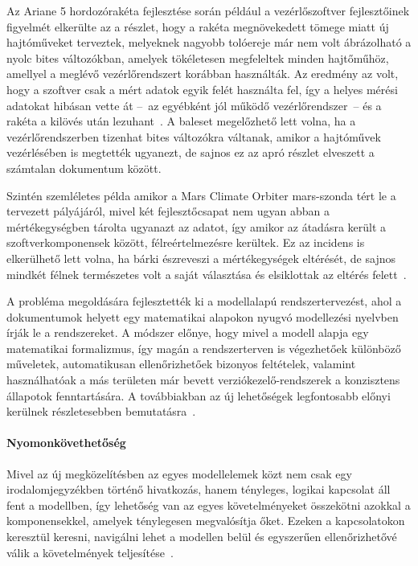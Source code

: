         Az Ariane 5 hordozórakéta fejlesztése során például a vezérlőszoftver fejlesztőinek figyelmét elkerülte az a részlet, hogy a rakéta megnövekedett tömege miatt új hajtóműveket terveztek, melyeknek nagyobb tolóereje már nem volt ábrázolható a nyolc bites változókban, amelyek tökéletesen megfeleltek minden hajtőműhöz, amellyel a meglévő vezérlőrendszert korábban használták.
        Az eredmény az volt, hogy a szoftver csak a mért adatok egyik felét használta fel, így a helyes mérési adatokat hibásan vette át --~az egyébként jól működő vezérlőrendszer~-- és a rakéta a kilövés után lezuhant~\cite{Arinane5_1996}.
        A baleset megelőzhető lett volna, ha a vezérlőrendszerben tizenhat bites változókra váltanak, amikor a hajtóművek vezérlésében is megtették ugyanezt, de sajnos ez az apró részlet elveszett a számtalan dokumentum között.
        
        Szintén szemléletes példa amikor a Mars Climate Orbiter mars-szonda tért le a tervezett pályájáról, mivel két fejlesztőcsapat nem ugyan abban a mértékegységben tárolta ugyanazt az adatot, így amikor az átadásra került a szoftverkomponensek között, félreértelmezésre kerültek. Ez az incidens is elkerülhető lett volna, ha bárki észreveszi a mértékegységek eltérését, de sajnos mindkét félnek természetes volt a saját választása és elsiklottak az eltérés felett~\cite{MCO2009}.

        A probléma megoldására fejlesztették ki a modellalapú rendszertervezést, ahol a dokumentumok helyett egy matematikai alapokon nyugvó modellezési nyelvben írják le a rendszereket. A módszer előnye, hogy mivel a modell alapja egy matematikai formalizmus, így magán a rendszerterven is végezhetőek különböző műveletek, automatikusan ellenőrizhetőek bizonyos feltételek, valamint használhatóak a más területen már bevett verziókezelő-rendszerek a konzisztens állapotok fenntartására.
        A továbbiakban az új lehetőségek legfontosabb előnyi kerülnek részletesebben bemutatásra~\cite{Madni_2018}.
        
        \paragraph{Nyomonkövethetőség}
        Mivel az új megközelítésben az egyes modellelemek közt nem csak egy irodalomjegyzékben történő hivatkozás, hanem tényleges, logikai kapcsolat áll fent a modellben, így lehetőség van az egyes követelményeket összekötni azokkal a komponensekkel, amelyek ténylegesen megvalósítja őket\cite{Madni_2018}. Ezeken a kapcsolatokon keresztül keresni, navigálni lehet a modellen belül és egyszerűen ellenőrizhetővé válik a követelmények teljesítése~\cite{Bajaj_2022}.
        
